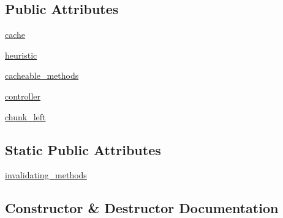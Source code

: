 \subsection*{Public Attributes}
\begin{DoxyCompactItemize}
\item 
\hyperlink{classpip_1_1__vendor_1_1cachecontrol_1_1adapter_1_1CacheControlAdapter_a2a60f2cbb159cd1732706a2cc3f77321}{cache}
\item 
\hyperlink{classpip_1_1__vendor_1_1cachecontrol_1_1adapter_1_1CacheControlAdapter_a8c7dd66b2ca89aa20daf58f9058a3937}{heuristic}
\item 
\hyperlink{classpip_1_1__vendor_1_1cachecontrol_1_1adapter_1_1CacheControlAdapter_a81865f403ea38521e80ef5122eaed1d0}{cacheable\+\_\+methods}
\item 
\hyperlink{classpip_1_1__vendor_1_1cachecontrol_1_1adapter_1_1CacheControlAdapter_a88b71ad4659a5d2428ed39d199528659}{controller}
\item 
\hyperlink{classpip_1_1__vendor_1_1cachecontrol_1_1adapter_1_1CacheControlAdapter_a7138c4afef2413fb8e5ceda9ae674b9e}{chunk\+\_\+left}
\end{DoxyCompactItemize}
\subsection*{Static Public Attributes}
\begin{DoxyCompactItemize}
\item 
\hyperlink{classpip_1_1__vendor_1_1cachecontrol_1_1adapter_1_1CacheControlAdapter_ad338d4b989c236af7d4c15920bb6d737}{invalidating\+\_\+methods}
\end{DoxyCompactItemize}


\subsection{Constructor \& Destructor Documentation}
\mbox{\label{classpip_1_1__vendor_1_1cachecontrol_1_1adapter_1_1CacheControlAdapter_a9e36b99d94a91c93c9f76fac3caf5c24}} 
